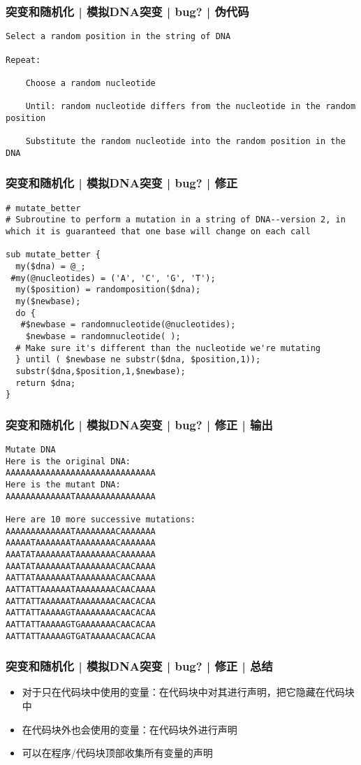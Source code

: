 \begin{frame}[fragile]
  \frametitle{突变和随机化 | 模拟DNA突变 | bug? | 伪代码}
\begin{lstlisting}
Select a random position in the string of DNA

Repeat:

    Choose a random nucleotide

    Until: random nucleotide differs from the nucleotide in the random position

    Substitute the random nucleotide into the random position in the DNA
\end{lstlisting}
\end{frame}

\begin{frame}[fragile]
  \frametitle{突变和随机化 | 模拟DNA突变 | bug? | \alert{修正}}
\begin{lstlisting}[basicstyle=\footnotesize\tt]
# mutate_better
# Subroutine to perform a mutation in a string of DNA--version 2, in which it is guaranteed that one base will change on each call

sub mutate_better {
  my($dna) = @_;
 #my(@nucleotides) = ('A', 'C', 'G', 'T');
  my($position) = randomposition($dna);
  my($newbase);
  do {
   #$newbase = randomnucleotide(@nucleotides);
    $newbase = randomnucleotide( );
  # Make sure it's different than the nucleotide we're mutating
  } until ( $newbase ne substr($dna, $position,1));
  substr($dna,$position,1,$newbase);
  return $dna;
}
\end{lstlisting}
\end{frame}

\begin{frame}[fragile]
  \frametitle{突变和随机化 | 模拟DNA突变 | bug? | 修正 | 输出}
\begin{lstlisting}
Mutate DNA
Here is the original DNA:
AAAAAAAAAAAAAAAAAAAAAAAAAAAAAA
Here is the mutant DNA:
AAAAAAAAAAAAATAAAAAAAAAAAAAAAA

Here are 10 more successive mutations:
AAAAAAAAAAAAATAAAAAAAACAAAAAAA
AAAAATAAAAAAATAAAAAAAACAAAAAAA
AAATATAAAAAAATAAAAAAAACAAAAAAA
AAATATAAAAAAATAAAAAAAACAACAAAA
AATTATAAAAAAATAAAAAAAACAACAAAA
AATTATTAAAAAATAAAAAAAACAACAAAA
AATTATTAAAAAATAAAAAAAACAACACAA
AATTATTAAAAAGTAAAAAAAACAACACAA
AATTATTAAAAAGTGAAAAAAACAACACAA
AATTATTAAAAAGTGATAAAAACAACACAA
\end{lstlisting}
\end{frame}

\begin{frame}
  \frametitle{突变和随机化 | 模拟DNA突变 | bug? | 修正 | \alert{总结}}
  \begin{itemize}
    \item 对于只在代码块中使用的变量：在代码块中对其进行声明，把它隐藏在代码块中
    \item 在代码块外也会使用的变量：在代码块外进行声明
    \item 可以在程序/代码块顶部收集所有变量的声明
  \end{itemize}
\end{frame}

